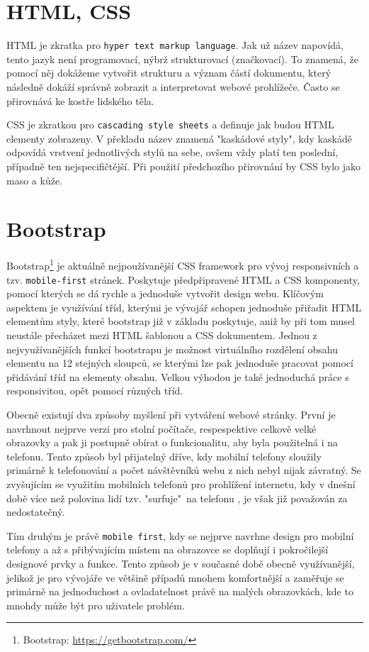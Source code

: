 \section{HTML, CSS}
HTML je zkratka pro \texttt{hyper text markup language}. Jak už název napovídá, tento jazyk není programovací, nýbrž strukturovací (značkovací). To znamená, že pomocí něj dokážeme vytvořit strukturu a význam částí dokumentu, který následně dokáží správně zobrazit a interpretovat webové prohlížeče. Často se přirovnává ke kostře lidského těla.  \cite{HTML}

\par CSS je zkratkou pro \texttt{cascading style sheets} a definuje jak budou HTML elementy zobrazeny. V překladu název znamená "kaskádové styly", kdy kaskádě odpovídá vrstvení jednotlivých stylů na sebe, ovšem vždy platí ten poslední, případně ten nejspecifičtější. Při použití předchozího přirovnání by CSS bylo jako maso a kůže. \cite{CSS} 


\section{Bootstrap}
Bootstrap\footnote{Bootstrap: \url{https://getbootstrap.com/}} je aktuálně nejpoužívanější CSS framework pro vývoj responsivních a tzv. \texttt{mobile-first} stránek. \cite{BOOTSTRAP} Poskytuje předpřipravené HTML a CSS komponenty, pomocí kterých se dá rychle a jednoduše vytvořit design webu. Klíčovým aspektem je využívání tříd, kterými je vývojář schopen jednoduše přiřadit HTML elementům styly, které bootstrap již v základu poskytuje, aniž by při tom musel neustále přecházet mezi HTML šablonou a CSS dokumentem. Jednou z nejvyužívanějších funkcí bootstrapu je možnost virtuálního rozdělení obsahu elementu na 12 stejných sloupců, se kterými lze pak jednoduše pracovat pomocí přidávání tříd na elementy obsahu. Velkou výhodou je také jednoduchá práce s responsivitou, opět pomocí různých tříd.
\par  Obecně existují dva způsoby myšlení při vytváření webové stránky. První je navrhnout nejprve verzi pro stolní počítače, respespektive celkově velké obrazovky a pak ji postupně obírat o funkcionalitu, aby byla použitelná i na telefonu. Tento způsob byl přijatelný dříve, kdy mobilní telefony sloužily primárně k telefonování a počet návštěvníků webu z nich nebyl nijak závratný. Se zvyšujícím se využitím mobilních telefonů pro prohlížení internetu, kdy v dnešní době více než polovina lidí tzv. "surfuje"\ na telefonu \cite{WEB-DEVICE-USAGE}, je však již považován za nedostatečný.
\par Tím druhým je právě \texttt{mobile first}, kdy se nejprve navrhne design pro mobilní telefony a až s přibývajícím místem na obrazovce se doplňují i pokročilejší designové prvky a funkce. Tento způsob je v současné době obecně využívanější, jelikož je pro vývojáře ve většině případů mnohem komfortnější a zaměřuje se primárně na jednoduchost a ovladatelnost právě na malých obrazovkách, kde to mnohdy může být pro uživatele problém.

